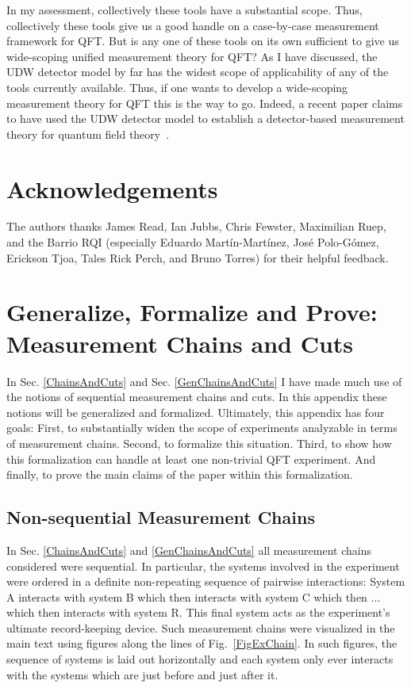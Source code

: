 \documentclass[12pt,prd,superscriptaddress,floatfix,amsmath,amssymb,amsfonts,nofootinbib]{revtex4-2}
\begin{document}
In my assessment, collectively these tools have a substantial scope. Thus, collectively these tools give us a good handle on a case-by-case measurement framework for QFT. But is any one of these tools on its own sufficient to give us wide-scoping unified measurement theory for QFT? As I have discussed, the UDW detector model by far has the widest scope of applicability of any of the tools currently available. Thus, if one wants to develop a wide-scoping measurement theory for QFT this is the way to go. Indeed, a recent paper claims to have used the UDW detector model to establish a detector-based measurement theory for quantum field theory~\cite{pologomez2021detectorbased}.

\section{Acknowledgements}
The authors thanks James Read, Ian Jubbs, Chris Fewster, Maximilian Ruep, and the Barrio RQI (especially Eduardo Mart\'{i}n-Mart\'{i}nez, Jos\'{e} Polo-G\'{o}mez, Erickson Tjoa, Tales Rick Perch, and Bruno Torres) for their helpful feedback.

%



\appendix
\section{Generalize, Formalize and Prove: Measurement Chains and Cuts}\label{Appendix1}
In Sec. \ref{ChainsAndCuts} and Sec. \ref{GenChainsAndCuts} I have made much use of the notions of sequential measurement chains and cuts. In this appendix these notions will be generalized and formalized. Ultimately, this appendix has four goals: First, to substantially widen the scope of experiments analyzable in terms of measurement chains. Second, to formalize this situation. Third, to show how this formalization can handle at least one non-trivial QFT experiment. And finally, to prove the main claims of the paper within this formalization.

\subsection{Non-sequential Measurement Chains}
In Sec. \ref{ChainsAndCuts} and \ref{GenChainsAndCuts} all measurement chains considered were sequential. In particular, the systems involved in the experiment were ordered in a definite non-repeating sequence of pairwise interactions: System A interacts with system B which then interacts with system C which then ... which then interacts with system R. This final system acts as the experiment's ultimate record-keeping device. Such measurement chains were visualized in the main text using figures along the lines of Fig.~\ref{FigExChain}. In such figures, the sequence of systems is laid out horizontally and each system only ever interacts with the systems which are just before and just after it.
\end{document}
